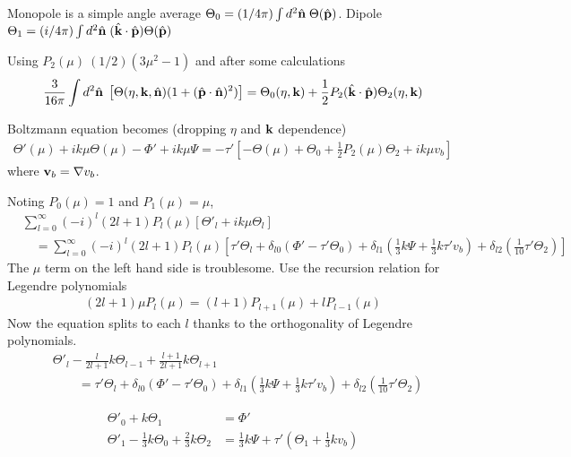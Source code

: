 Monopole is a simple angle average $\Theta_0 = (1/4\pi) \int d^2\hat{\mathbf{n}} \; \Theta(\hat{\mathbf{p}})$. Dipole $\Theta_1 = (i/4\pi) \int d^2\hat{\mathbf{n}} \; (\hat{\mathbf{k}} \cdot \hat{\mathbf{p}}) \Theta(\hat{\mathbf{p}})$

Using $P_2(\mu) \ (1/2)(3\mu^2 -1)$ and after some calculations
\begin{align}
	\frac{3}{16\pi} \int d^2\hat{\mathbf{n}} \; \left[ \Theta(\eta,\mathbf{k},\hat{\mathbf{n}}) (1 + (\hat{\mathbf{p}} \cdot \hat{\mathbf{n}})^2) \right] = \Theta_0 (\eta,\mathbf{k}) + \frac{1}{2} P_2 (\hat{\mathbf{k}} \cdot \hat{\mathbf{p}}) \Theta_2(\eta, \mathbf{k}) 
\end{align}

Boltzmann equation becomes (dropping $\eta$ and $\mathbf{k}$ dependence)
\begin{align}
	\Theta'(\mu) + ik\mu \Theta(\mu) - \Phi' + ik\mu\Psi = -\tau' \left[ - \Theta(\mu) + \Theta_0 + \frac{1}{2}P_2(\mu)\Theta_2 + ik\mu v_b \right]
\end{align}
where $\mathbf{v}_b = \nabla v_b$.

Noting $P_0(\mu) = 1$ and $P_1(\mu)=\mu$,
\begin{align}
	&\sum_{l=0}^{\infty} (-i)^l (2l+1) P_l (\mu) \left[ \Theta'_l + ik\mu \Theta_l \right] \nonumber\\
	&\quad= \sum_{l=0}^{\infty} (-i)^l (2l+1) P_l (\mu) \left[ \tau' \Theta_l + \delta_{l0} (\Phi' - \tau'\Theta_0) + \delta_{l1} (\frac{1}{3}k\Psi + \frac{1}{3}k\tau' v_b) + \delta_{l2}(\frac{1}{10}\tau' \Theta_2) \right]
\end{align}
The $\mu$ term on the left hand side is troublesome. Use the recursion relation for Legendre polynomials
\begin{align}
	(2l+1)\mu P_l(\mu) = (l+1) P_{l+1} (\mu) + l P_{l-1} (\mu)
\end{align}
Now the equation splits to each $l$ thanks to the orthogonality of Legendre polynomials.
\begin{align}
	&\Theta'_l - \frac{l}{2l+1} k\Theta_{l-1} + \frac{l+1}{2l+1} k\Theta_{l+1}  \nonumber\\
	&\qquad= \tau' \Theta_l + \delta_{l0} (\Phi' - \tau' \Theta_0) + \delta_{l1} (\frac{1}{3} k\Psi + \frac{1}{3} k\tau' v_b) + \delta_{l2}(\frac{1}{10}\tau' \Theta_2)
\end{align}

\begin{align}
	\Theta'_0 + k\Theta_1 &= \Phi' \\
	\Theta'_1 - \frac{1}{3} k\Theta_0 +\frac{2}{3} k\Theta_2 &= \frac{1}{3} k \Psi + \tau'(\Theta_1 + \frac{1}{3} k v_b)
\end{align}


